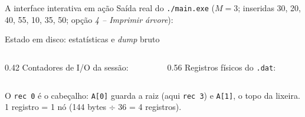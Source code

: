 \documentclass[aspectratio=169,11pt]{beamer}
\begin{document}
\begin{frame}[fragile]{A interface interativa em ação}
  \footnotesize Saída \alert{real} do \texttt{./main.exe} ($M{=}3$; inseridas
  30, 20, 40, 55, 10, 35, 50; opção \emph{4 -- Imprimir árvore}):
  
\end{frame}

\begin{frame}[fragile]{Estado em disco: estatísticas e \emph{dump} bruto}
  \begin{columns}[T,onlytextwidth]
    \begin{column}{0.42\textwidth}
      \footnotesize Contadores de I/O da sessão:
      
    \end{column}
    \begin{column}{0.56\textwidth}
      \footnotesize Registros físicos do \texttt{.dat}:
      
    \end{column}
  \end{columns}
  \vspace{0.3em}
  \footnotesize O \texttt{rec 0} é o cabeçalho: \texttt{A[0]} guarda a raiz
  (aqui \texttt{rec 3}) e \texttt{A[1]}, o topo da lixeira. \alert{1 registro = 1 nó}
  (144 bytes $\div$ 36 = 4 registros).
\end{frame}
\end{document}
